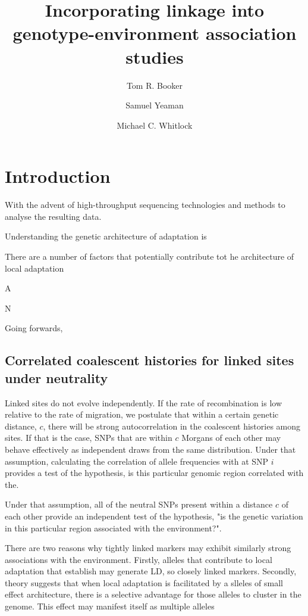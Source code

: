 \documentclass[11pt,twoside,lineno]{GSA_format}
\title{Incorporating linkage into genotype-environment association studies}
\author[$\ast$]{Tom R. Booker}
\author[$\dagger$]{Samuel Yeaman}
\author[$\ast$]{Michael C. Whitlock}
\affil[$\ast$]{University of British Columbia}
\affil[$\dagger$]{University of Calgary}
\begin{document}
\maketitle
\marginmark
\firstpagefootnote


\vspace{-33pt}%

\section{Introduction}

With the advent of high-throughput sequencing technologies and methods to analyse the resulting data.

Understanding the genetic architecture of adaptation is 

There are a number of factors that potentially contribute tot he architecture of local adaptation

A

N

Going forwards, 

\subsection{Correlated coalescent histories for linked sites under neutrality}

Linked sites do not evolve independently. If the rate of recombination is low relative to the rate of migration, we postulate that within a certain genetic distance, $c$, there will be strong autocorrelation in the coalescent histories among sites. If that is the case, SNPs that are within $c$ Morgans of each other may behave effectively as independent draws from the same distribution. Under that assumption, calculating the correlation of allele frequencies with at SNP $i$ provides a test of the hypothesis, is this particular genomic region correlated with the.

Under that assumption, all of the neutral SNPs present within a distance $c$ of each other provide an independent test of the hypothesis, "is the genetic variation in this particular region associated with the environment?".

There are two reasons why tightly linked markers may exhibit similarly strong associations with the environment. Firstly, alleles that contribute to local adaptation that establish may generate LD, so closely linked markers. Secondly, theory suggests that when local adaptation is facilitated by a slleles of small effect architecture, there is a selective advantage for those alleles to cluster in the genome. This effect may manifest itself as multiple alleles 
\end{document}
